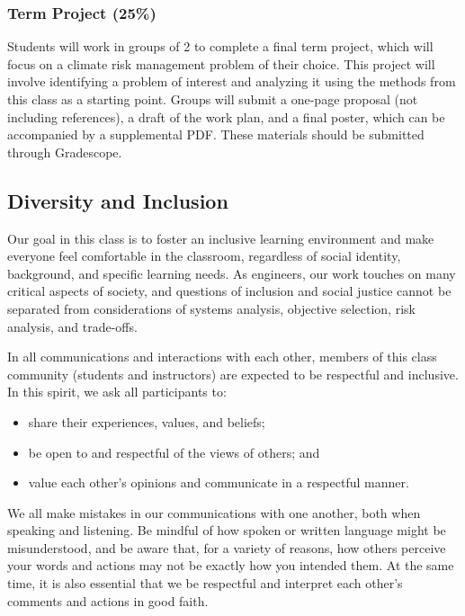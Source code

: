\documentclass[12pt,a4paper]{article}
\begin{document}
\subsubsection{Term Project (25\%)}
Students will work in groups of 2 to complete a final term project, which will focus on a climate risk management problem of their choice. This project will involve identifying a problem of interest and analyzing it using the methods from this class as a starting point. Groups will submit a one-page proposal (not including references), a draft of the work plan, and a final poster, which can be accompanied by a supplemental PDF. These materials should be submitted through Gradescope.

\subsection{Diversity and Inclusion}
Our goal in this class is to foster an inclusive learning environment and make everyone feel comfortable in the classroom, regardless of social identity, background, and specific learning needs. As engineers, our work touches on many critical aspects of society, and questions of inclusion and social justice cannot be separated from considerations of systems analysis, objective selection, risk analysis, and trade-offs. 

In all communications and interactions with each other, members of this class community (students and instructors) are expected to be respectful and inclusive. In this spirit, we ask all participants to:

\begin{itemize}
\item share their experiences, values, and beliefs;


\item be open to and respectful of the views of others; and


\item value each other's opinions and communicate in a respectful manner.

\end{itemize}
We all make mistakes in our communications with one another, both when speaking and listening. Be mindful of how spoken or written language might be misunderstood, and be aware that, for a variety of reasons, how others perceive your words and actions may not be exactly how you intended them. At the same time, it is also essential that we be respectful and interpret each other's comments and actions in good faith. 
\end{document}
